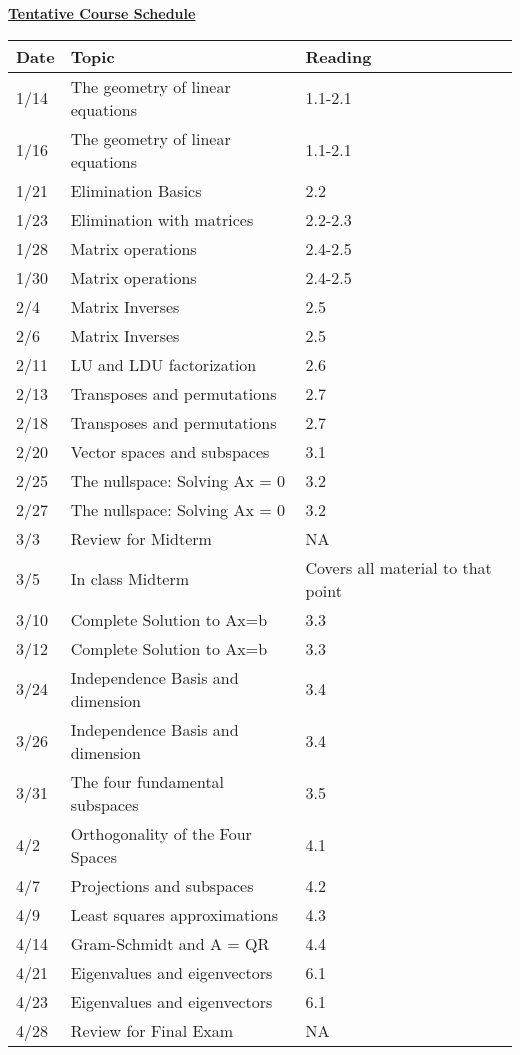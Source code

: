 \documentclass[11pt, a4paper]{article}
\begin{document}
\centerline{ \underline{\textbf{Tentative Course Schedule}}}
\footnotesize
\begin{tabular}{ |p{0.5in}|p{3.0in}|p{2.0in}| }
\hline
  \textbf{Date} & \textbf{Topic} & \textbf{Reading}  \\ \hline
1/14 & The geometry of linear equations &  1.1-2.1 \\ \hline
1/16 & The geometry of linear equations &  1.1-2.1 \\ \hline
1/21 & Elimination Basics &  2.2 \\ \hline
1/23 & Elimination with matrices &  2.2-2.3 \\ \hline
1/28 & Matrix operations &  2.4-2.5﻿ \\ \hline
1/30 & Matrix operations &  2.4-2.5﻿ \\ \hline
2/4 & Matrix Inverses &  2.5 \\ \hline
2/6 & Matrix Inverses &  2.5 \\ \hline
2/11 & LU and LDU factorization &  2.6﻿ \\ \hline
2/13 & Transposes and permutations &  2.7﻿ \\ \hline
2/18 & Transposes and permutations &  2.7﻿ \\ \hline
2/20 & Vector spaces and subspaces &  3.1﻿ \\ \hline
2/25 & The nullspace: Solving Ax = 0 &  3.2﻿ \\ \hline
2/27 & The nullspace: Solving Ax = 0 &  3.2﻿ \\ \hline
3/3 & Review for Midterm &  NA \\ \hline
3/5 & In class Midterm &   Covers all material to that point \\ \hline
3/10 & Complete Solution to Ax=b &  3.3 \\ \hline
3/12 & Complete Solution to Ax=b &  3.3 \\ \hline
3/24 & Independence Basis and dimension &  3.4 \\ \hline
3/26 & Independence Basis and dimension &  3.4 \\ \hline
3/31 & The four fundamental subspaces &  3.5 \\ \hline
4/2 & Orthogonality of the Four Spaces &  4.1 \\ \hline
4/7 & Projections and subspaces &  4.2 \\ \hline
4/9 & Least squares approximations &  4.3 \\ \hline
4/14 & Gram-Schmidt and A = QR &  4.4 \\ \hline
4/21 & Eigenvalues and eigenvectors &  6.1 \\ \hline
4/23 & Eigenvalues and eigenvectors &  6.1 \\ \hline
4/28 & Review for Final Exam &  NA \\ \hline


\end{tabular}

\end{document}
